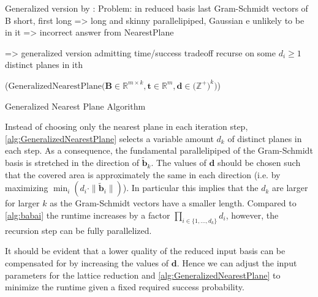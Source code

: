 Generalized version by \cite{LP11}:
Problem: in reduced basis last Gram-Schmidt vectors of B short, first long => long and skinny parallelipiped, Gaussian e unlikely to be in it => incorrect answer from NearestPlane

=> generalized version admitting time/success tradeoff
recurse on some $d_i \geq 1$ distinct planes in ith 

\begin{algorithm2e}
  \Begin($\text{GeneralizedNearestPlane} {(} \mathbf{B} \in \mathbb{R}^{m \times k},\mathbf{t} \in \mathbb{R}^{m}, \mathbf{d} \in {(}\mathbb{Z}^+{)}^k {)}$) 
  { %
  }
\caption{Generalized Nearest Plane Algorithm \cite{LP11}}\label{alg:GeneralizedNearestPlane}
\end{algorithm2e}
Instead of choosing only the nearest plane in each iteration step, \cref{alg:GeneralizedNearestPlane} selects a variable amount $d_k$ of distinct planes in each step. As a consequence, the fundamental parallelipiped of the Gram-Schmidt basis is stretched in the direction of $\tilde{\mathbf{b}}_k$. The values of $\mathbf{d}$ should be chosen such that the covered area is approximately the same in each direction (i.e. by maximizing $\min_i(d_i \cdot \|\tilde{\mathbf{b}}_i\|)$). In particular this implies that the $d_k$ are larger for larger $k$ as the Gram-Schmidt vectors have a smaller length. %
Compared to \cref{alg:babai} the runtime increases by a factor $\prod_{i \in \{1, \dots, d_k\}} d_i$, however, the recursion step can be fully parallelized.

It should be evident that a lower quality of the reduced input basis can be compensated for by increasing the values of $\mathbf{d}$. Hence we can adjust the input parameters for the lattice reduction and \cref{alg:GeneralizedNearestPlane} to minimize the runtime given a fixed required success probability. %




